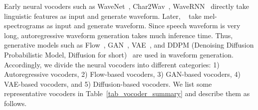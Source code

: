\documentclass{article}
\begin{document}
Early neural vocoders such as WaveNet~\cite{oord2016wavenet,oord2018parallel}, Char2Wav~\cite{sotelo2017char2wav}, WaveRNN~\cite{kalchbrenner2018efficient} directly take linguistic features as input and generate waveform. Later, ~\citet{prenger2019waveglow,kim2019flowavenet,kumar2019melgan,yamamoto2020parallel} take mel-spectrograms as input and generate waveform. Since speech waveform is very long, autoregressive waveform generation takes much inference time. Thus, generative models such as Flow~\cite{dinh2014nice,kingma2016improved,kingma2018glow}, GAN~\cite{goodfellow2014generative}, VAE~\cite{kingma2013auto}, and DDPM (Denoising Diffusion Probabilistic Model, Diffusion for short)~\cite{sohl2015deep,ho2020denoising} are used in waveform generation. Accordingly, we divide the neural vocoders into different categories: 1) Autoregressive vocoders, 2) Flow-based vocoders, 3) GAN-based vocoders, 4) VAE-based vocoders, and 5) Diffusion-based vocoders. We list some representative vocoders in Table~\ref{tab_vocoder_summary} and describe them as follows.
\end{document}
